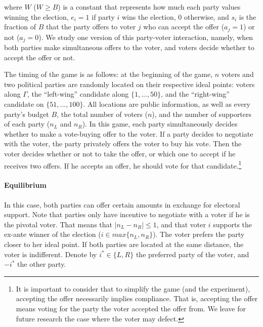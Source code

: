 where $W$ ($W\geq B$) is a constant that represents how much each party values winning the election, $e_i=1$ if party $i$ wins the election, 0 otherwise, and $s_i$ is the fraction of $B$ that the party offers to voter $j$ who can accept the offer ($a_j=1$) or not ($a_j=0$). We study one version of this party-voter interaction, namely, when both parties make simultaneous offers to the voter, and voters decide whether to accept the offer or not. 


The timing of the game is as follows: at the beginning of the game, $n$ voters and two political parties are randomly located on their respective ideal points: voters along $\Gamma$, the ``left-wing'' candidate along $\{1,...,50\}$, and the ``right-wing'' candidate on $\{51,...,100\}$. All locations are public information, as well as every party's budget $B$, the total number of voters ($n$), and the number of supporters of each party ($n_L$ and $n_R$). In this game, each party simultaneously decides whether to make a vote-buying offer to the voter. If a party decides to negotiate with the voter, the party privately offers the voter to buy his vote. Then the voter decides whether or not to take the offer, or which one to accept if he receives two offers. If he accepts an offer, he should vote for that candidate.\footnote{It is important to consider that to simplify the game (and the experiment), accepting the offer necessarily implies compliance. That is, accepting the offer means voting for the party the voter accepted the offer from. We leave for future research the case where the voter may defect.} %

\paragraph{Equilibrium} In this case, both parties can offer certain amounts in exchange for electoral support. Note that parties only have incentive to negotiate with a voter if he is the pivotal voter. That means that $\vert n_L -n_R \vert \leq 1$, and that voter $i$ supports the ex-ante winner of the election ($i\in max\{n_L,n_R\}$). The voter prefers the party closer to her ideal point. If both parties are located at the same distance, the voter is indifferent. Denote by $i^*\in \{L,R\}$ the preferred party of the voter, and $-i^*$ the other party. 
 
